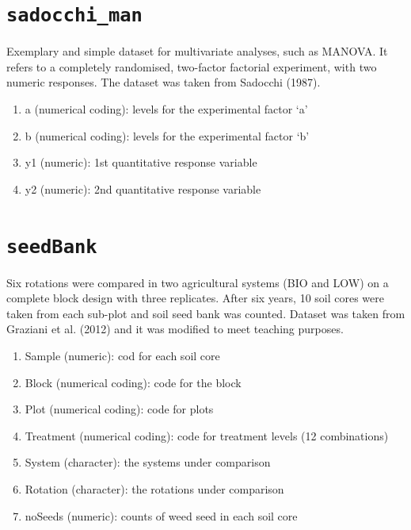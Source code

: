 \documentclass[
  letterpaper,
  DIV=11,
  numbers=noendperiod]{scrreprt}
\providecommand{\tightlist}{%
  \setlength{\itemsep}{0pt}\setlength{\parskip}{0pt}}
\begin{document}
\section*{\texorpdfstring{\texttt{sadocchi\_man}}{sadocchi\_man}}\label{sadocchi_man}


Exemplary and simple dataset for multivariate analyses, such as MANOVA.
It refers to a completely randomised, two-factor factorial experiment,
with two numeric responses. The dataset was taken from Sadocchi (1987).

\begin{enumerate}
\def\labelenumi{\arabic{enumi}.}
\tightlist
\item
  a (numerical coding): levels for the experimental factor `a'
\item
  b (numerical coding): levels for the experimental factor `b'
\item
  y1 (numeric): 1st quantitative response variable
\item
  y2 (numeric): 2nd quantitative response variable
\end{enumerate}

\section*{\texorpdfstring{\texttt{seedBank}}{seedBank}}\label{seedBank}


Six rotations were compared in two agricultural systems (BIO and LOW) on
a complete block design with three replicates. After six years, 10 soil
cores were taken from each sub-plot and soil seed bank was counted.
Dataset was taken from Graziani et al. (2012) and it was modified to
meet teaching purposes.

\begin{enumerate}
\def\labelenumi{\arabic{enumi}.}
\tightlist
\item
  Sample (numeric): cod for each soil core
\item
  Block (numerical coding): code for the block
\item
  Plot (numerical coding): code for plots
\item
  Treatment (numerical coding): code for treatment levels (12
  combinations)
\item
  System (character): the systems under comparison
\item
  Rotation (character): the rotations under comparison
\item
  noSeeds (numeric): counts of weed seed in each soil core
\end{enumerate}
\end{document}
